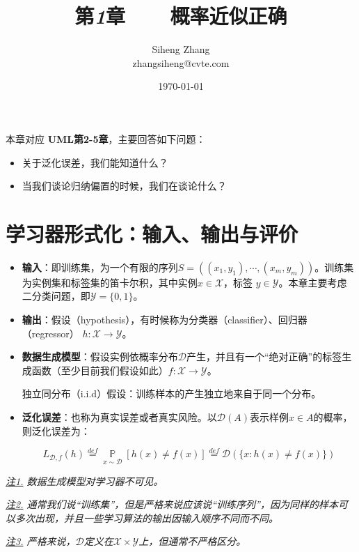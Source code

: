\documentclass{article}
\author{Siheng Zhang\\zhangsiheng@cvte.com}
\title{第\textbf{\textit{1}}章\ \ \ \ 概率近似正确}
\date{\today}
\begin{document}
\maketitle  


本章对应 \textbf{UML第2-5章}，主要回答如下问题：

\begin{itemize}
\item 关于泛化误差，我们能知道什么？
\item 当我们谈论归纳偏置的时候，我们在谈论什么？
\end{itemize}

\tableofcontents
\newpage

\section{学习器形式化：输入、输出与评价}

\begin{itemize}

	\item \textbf{输入}：即训练集，为一个有限的序列$S=((x_1,y_1),\cdots,(x_m,y_m))$。训练集为实例集和标签集的笛卡尔积，其中实例$x \in \mathcal{X}$，标签 $y \in \mathcal{Y}$。本章主要考虑二分类问题，即$\mathcal{Y}=\{0,1\}$。
	
	\item \textbf{输出}：假设（hypothesis），有时候称为分类器（classifier）、回归器（regressor） $h:\mathcal{X}\rightarrow\mathcal{Y}$。

	\item \textbf{数据生成模型}：假设实例依概率分布$\mathcal{D}$产生，并且有一个“绝对正确”的标签生成函数（至少目前我们假设如此）$f:\mathcal{X}\rightarrow\mathcal{Y}$。
	
	独立同分布（i.i.d）假设：训练样本的产生独立地来自于同一个分布。
	
	\item \textbf{泛化误差}：也称为真实误差或者真实风险。以$\mathcal{D}(A)$表示样例$x \in A$的概率，则泛化误差为：
	
	\begin{equation}
	L_{\mathcal{D},f}(h)\overset{def}{=}\mathop{\mathbb{P}}\limits_{x\sim\mathcal{D}}[h(x)\neq f(x)]\overset{def}{=}\mathcal{D}(\{x:h(x)\neq f(x)\})
	\end{equation}
	
\end{itemize}

	\vspace{1mm}
	\begin{scriptsize}
	\begin{spacing}{1.2}
	{\sffamily
	\noindent\textit{\underline{注1.} 数据生成模型对学习器不可见。}

    \noindent\textit{\underline{注2.} 通常我们说“训练集”，但是严格来说应该说“训练序列”，因为同样的样本可以多次出现，并且一些学习算法的输出因输入顺序不同而不同。}
    
    \noindent\textit{\underline{注3.} 严格来说，$\mathcal{D}$定义在$\mathcal{X}\times\mathcal{Y}$上，但通常不严格区分。}}
	\end{spacing}
	\end{scriptsize}
	\vspace{-3mm}
	
\end{document}
